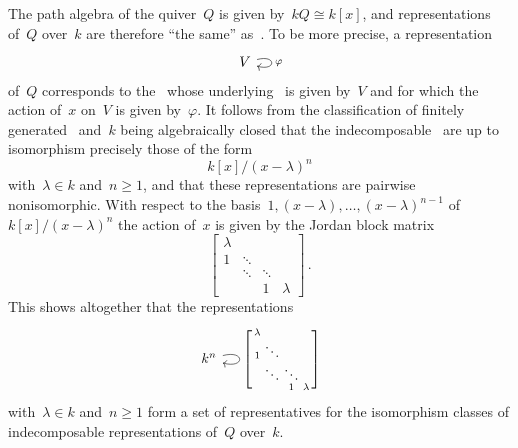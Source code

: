 \section{}





\subsection{}

The path algebra of the quiver~$Q$ is given by~$kQ \cong k[x]$, and representations of~$Q$ over~$k$ are therefore \enquote{the same} as~{}.
To be more precise, a representation
\[
  \begin{tikzcd}
    V
    \arrow[loop right]{}[right]{\varphi}
  \end{tikzcd}
\]
of~$Q$ corresponds to the~{} whose underlying~{\kvs} is given by~$V$ and for which the action of~$x$ on~$V$ is given by~$\varphi$.
It follows from the classification of finitely generated~{} and~$k$ being algebraically closed that the {\fd} indecomposable~{} are up to isomorphism precisely those of the form
\[
  k[x]/(x-\lambda)^n
\]
with~$\lambda \in k$ and~$n \geq 1$, and that these representations are pairwise nonisomorphic.
With respect to the basis~$1, (x-\lambda), \dotsc, (x-\lambda)^{n-1}$ of~$k[x]/(x-\lambda)^n$ the action of~$x$ is given by the Jordan block matrix
\[
  \begin{bmatrix}
      \lambda
    & {}
    & {}
    & {}
    \\
      1
    & \ddots
    & {}
    & {}
    \\
      {}
    & \ddots
    & \ddots
    & {}
    \\
      {}
    & {}
    & 1
    & \lambda
  \end{bmatrix} \,.
\]
This shows altogether that the representations
\[
  \begin{tikzcd}[ampersand replacement = \&]
    k^n
    \arrow[loop right]{}[right]{
      \begin{bsmallmatrix}
          \lambda
        & {}
        & {}
        & {}
        \\
          1
        & \ddots
        & {}
        & {}
        \\
          {}
        & \ddots
        & \ddots
        & {}
        \\
          {}
        & {}
        & 1
        & \lambda
      \end{bsmallmatrix}
    }
  \end{tikzcd}
\]
with~$\lambda \in k$ and~$n \geq 1$ form a set of representatives for the isomorphism classes of {\fd} indecomposable representations of~$Q$ over~$k$.





